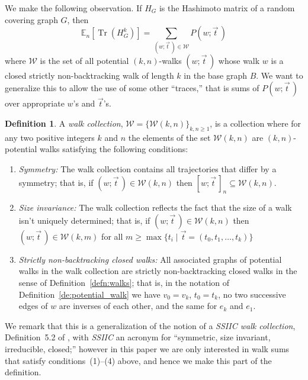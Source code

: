 \documentclass{memo-l}
\theoremstyle{plain}
\theoremstyle{definition}
\numberwithin{section}{chapter}
\numberwithin{equation}{chapter}
\DeclareMathOperator{\Tr}{Tr}
\newcommand{\potwalk}{(w;\vec t\,)}
\newcommand{\potwalkclass}{[w;\vec t\,]_n}
\theoremstyle{plain}
\theoremstyle{definition}
\newtheorem{defn}[theorem]{Definition}
\newcommand\EE{\mathbb{E}}
\newcommand\cW{\mathcal{W}}
\begin{document}
We make the following observation. If \(H_G\) is the Hashimoto matrix of a
random covering graph \(G\), then \[ \EE_n \left[ \Tr(H_G^k) \right] =
\sum_{\potwalk \in \cW}P\potwalk \] where \( \cW \) is the set of all
potential \((k,n)\)-walks \(\potwalk\) whose walk \(w\) is a closed
strictly non-backtracking walk of length \(k\) in the base graph \(B\). We
want to generalize this to allow the use of some other ``traces,'' that is
sums of \( P\potwalk \) over appropriate \(w\)'s and \( \vec t\)'s.

\begin{defn}
\label{de:walk_collection}
 A 
\emph{walk collection}, 
\( \mathcal{W} = \{ \mathcal{W}(k,n) \}_{k,n \geq 1} \), is a
collection where for any two positive integers \( k \) and \( n \) the
elements of the set \( \mathcal{W}(k,n) \) are $(k,n)$-potential walks
satisfying the following conditions:  
\begin{enumerate}[label= (\arabic*)]
\item \emph{Symmetry:} The walk collection contains all trajectories that
differ by a symmetry; that is, if \( \potwalk \in \mathcal{W}(k,n) \) then
\( \potwalkclass \subseteq \mathcal{W}(k,n) \).  
\item \emph{Size
invariance:} The walk collection reflects the fact that the size of a walk
isn't uniquely determined; that is, if \( \potwalk \in \mathcal{W}(k,n) \)
then \( \potwalk \in \mathcal{W}(k,m) \) for all \( m \geq \max\{ t_i \mid
\vec t = \left( t_0, t_1, \ldots, t_k \right) \} \) 
\item \emph{Strictly non-backtracking closed
walks:} All associated graphs of potential walks in the walk collection 
are strictly
non-backtracking closed walks in the sense of 
Definition~\ref{defn:walks}; that is, in the notation of
Definition~\ref{de:potential_walk}
we have $v_0=v_k$,
$t_0=t_k$, no two successive edges
of $w$  are inverses of each other, and the same for $e_k$ and $e_1$.
\end{enumerate} 

We remark that this is a generalization of the notion of a
{\em SSIIC walk collection}, Definition~5.2 of \cite{friedman_alon}, with 
{\em SSIIC} an acronym for ``symmetric, size invariant, irreducible,
closed;''  however in this paper we are only interested in walk
sums that satisfy conditions~(1)--(4) above, and hence we make this
part of the definition.


\end{defn}
\end{document}
